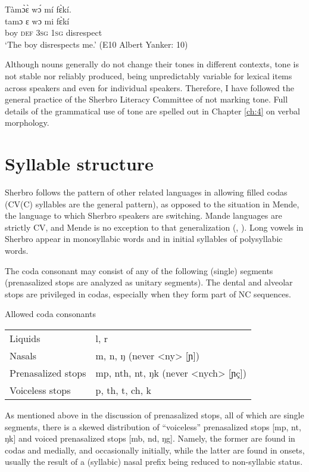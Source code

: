 \ex Tàmɔ̀ɛ̀   wɔ́ mí fɛ̀kí.\\
\gll tamɔ  ɛ    wɔ    mi    fɛ̀kí\\
boy  \textsc{def}  \textsc{3sg}  \textsc{1sg}  disrespect\\
\glt ‘The boy disrespects me.' (E10 Albert Yanker: 10)
\z
\z

Although nouns generally do not change their tones in different contexts, tone is not stable nor reliably produced, being unpredictably variable for lexical items across speakers and even for individual speakers. Therefore, I have followed the general practice of the Sherbro Literacy Committee of not marking tone. Full details of the grammatical use of tone are spelled out in Chapter \ref{ch:4} on verbal morphology.

\section{Syllable structure}
\label{sec:2.3}\hypertarget{Toc115517757}{}
Sherbro follows the pattern of other related languages in allowing filled codas (CV(C) syllables are the general pattern), as opposed to the situation in Mende, the language to which Sherbro speakers are switching. Mande languages are strictly CV, and Mende is no exception to that generalization (\citealt{Dwyer1989}, \citealt{Vydrin2004}). Long vowels in Sherbro appear in monosyllabic words and in initial syllables of polysyllabic words.

The coda consonant may consist of any of the following (single) segments (prenasalized stops are analyzed as unitary segments). The dental and alveolar stops are privileged in codas, especially when they form part of NC sequences.

\ea%
\label{ex:33}
Allowed coda consonants\\

\begin{tabular}[t]{ll}
Liquids & l, r\\
Nasals & m, n, ŋ (never <ny> [ɲ])\\
Prenasalized stops & mp, nth, nt, ŋk (never <nych> [ɲç])\\
Voiceless stops & p, th, t, ch, k\\
\end{tabular}
\z

As mentioned above in the discussion of prenasalized stops, all of which are single segments, there is a skewed distribution of “voiceless” prenasalized stops [mp, nt, ŋk] and voiced prenasalized stops [mb, nd, ŋg]. Namely, the former are found in codas and medially, and occasionally initially, while the latter are found in onsets, usually the result of a (syllabic) nasal prefix being reduced to non-syllabic status.

